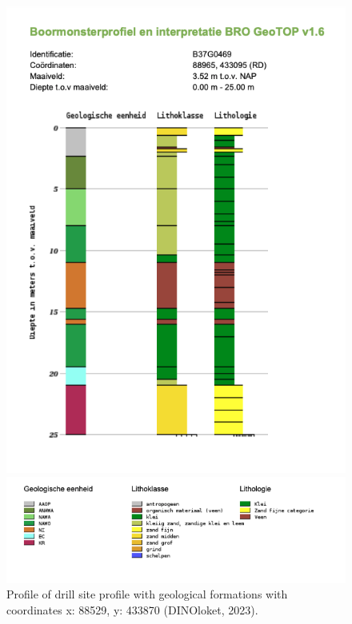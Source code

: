 \begin{figure}[htbp]
    \centering
    \begin{minipage}{0.30\linewidth}
        \includegraphics[width=\linewidth]{figures/heij/drillsite.png}
        \caption{Profile of drill site profile with geological formations with coordinates x: 88529, y: 433870 (DINOloket, 2023).}
        \label{geoheij}
    \end{minipage}
    \hfill
    \begin{minipage}{0.60\linewidth}
        \includegraphics[width=\linewidth]{figures/heij/litho.png}
        
    \end{minipage}
\end{figure}
